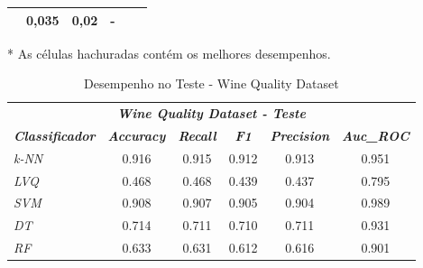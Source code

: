 \documentclass[journal]{IEEEtran}
\begin{document}
\begin{table}[h!]
\begin{threeparttable}
\begin{tabular}{lccccc}
			                                                     & 0,035
			                                                     & 0,02
			                                                     & -                                                                                                                                               \\
			\hline
		\end{tabular}
		\begin{tablenotes}\footnotesize
			\item[*] As células hachuradas contém os melhores desempenhos.
		\end{tablenotes}
	\end{threeparttable}
\end{table}

\begin{table}[h!]
	\caption{Desempenho no Teste - Wine Quality Dataset}
	\label{tab:7}
	\begin{threeparttable}
		\begin{tabular}{lccccc}
			\hline
			\multicolumn{6}{c}{\textit{\textbf{Wine Quality Dataset - Teste}}}                                                                                                                                     \\
			\multicolumn{1}{l|}{\textit{\textbf{Classificador}}} & \textit{\textbf{Accuracy}} & \textit{\textbf{Recall}}   & \textit{\textbf{F1}}       & \textit{\textbf{Precision}} & \textit{\textbf{Auc\_ROC}} \\ \hline
			\multicolumn{1}{l|}{\textit{k-NN}}                   & 0.916                      & 0.915                      & 0.912                      & 0.913                       & 0.951                      \\
			\multicolumn{1}{l|}{\textit{LVQ}}                    & 0.468                      & 0.468                      & 0.439                      & 0.437                       & 0.795                      \\
			\multicolumn{1}{l|}{\textit{SVM}}                    & 0.908                      & 0.907                      & 0.905                      & 0.904                       & 0.989                      \\
			\multicolumn{1}{l|}{\textit{DT}}                     & 0.714                      & 0.711                      & 0.710                      & 0.711                       & 0.931                      \\
			\multicolumn{1}{l|}{\textit{RF}}                     & 0.633                      & 0.631                      & 0.612                      & 0.616                       & 0.901                      \\

\end{tabular}
\end{threeparttable}
\end{table}
\end{document}
